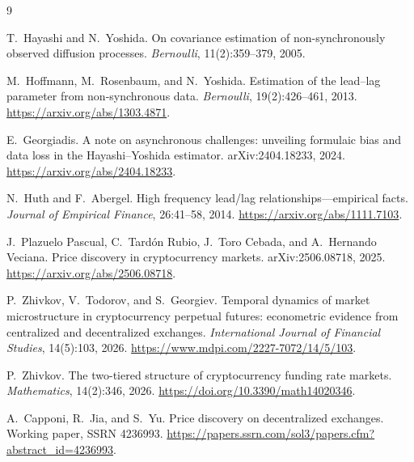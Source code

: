 \documentclass[11pt,a4paper]{article}
\begin{document}
\begin{thebibliography}{9}

T.~Hayashi and N.~Yoshida.
On covariance estimation of non-synchronously observed diffusion processes.
\emph{Bernoulli}, 11(2):359--379, 2005.

M.~Hoffmann, M.~Rosenbaum, and N.~Yoshida.
Estimation of the lead--lag parameter from non-synchronous data.
\emph{Bernoulli}, 19(2):426--461, 2013. \url{https://arxiv.org/abs/1303.4871}.

E.~Georgiadis.
A note on asynchronous challenges: unveiling formulaic bias and data loss in the
Hayashi--Yoshida estimator.
arXiv:2404.18233, 2024. \url{https://arxiv.org/abs/2404.18233}.

N.~Huth and F.~Abergel.
High frequency lead/lag relationships---empirical facts.
\emph{Journal of Empirical Finance}, 26:41--58, 2014. \url{https://arxiv.org/abs/1111.7103}.

J.~Plazuelo Pascual, C.~Tard\'on Rubio, J.~Toro Cebada, and A.~Hernando Veciana.
Price discovery in cryptocurrency markets.
arXiv:2506.08718, 2025. \url{https://arxiv.org/abs/2506.08718}.

P.~Zhivkov, V.~Todorov, and S.~Georgiev.
Temporal dynamics of market microstructure in cryptocurrency perpetual futures: econometric
evidence from centralized and decentralized exchanges.
\emph{International Journal of Financial Studies}, 14(5):103, 2026.
\url{https://www.mdpi.com/2227-7072/14/5/103}.

P.~Zhivkov.
The two-tiered structure of cryptocurrency funding rate markets.
\emph{Mathematics}, 14(2):346, 2026. \url{https://doi.org/10.3390/math14020346}.

A.~Capponi, R.~Jia, and S.~Yu.
Price discovery on decentralized exchanges.
Working paper, SSRN 4236993. \url{https://papers.ssrn.com/sol3/papers.cfm?abstract_id=4236993}.


\end{thebibliography}
\end{document}

